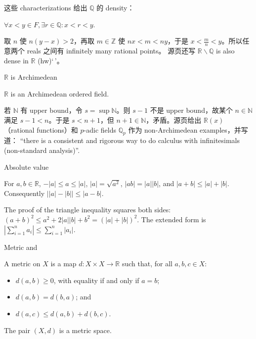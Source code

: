 这些 characterizations 给出 \(\mathbb{Q}\) 的 density：

\(\forall x < y \in F,\exists r \in \mathbb{Q}:x < r < y.\)

取 \(n\) 使 \(n\left( {y - x} \right) > 2\)，再取 \(m \in \mathbb{Z}\) 使 \(nx < m < ny\)，于是 \(x < \frac{m}{n} < y\)。所以任意两个 reals 之间有 infinitely many rational points。 源页还写 \(\mathbb{R} \smallsetminus \mathbb{Q}\) is also dense in \(\mathbb{R}\) (hw)`\,'。

\begin{theorem}{\(\mathbb{R}\) is Archimedean}

\(\mathbb{R}\) is an Archimedean ordered field.

\end{theorem}

若 \(\mathbb{N}\) 有 upper bound，令 \(s = \sup\mathbb{N}\)。则 \(s - 1\) 不是 upper bound，故某个 \(n \in \mathbb{N}\) 满足 \(s - 1 < n\)。于是 \(s < n + 1\)，但 \(n + 1 \in \mathbb{N}\)，矛盾。源页给出 \(\mathbb{R}(x)\)（rational functions）和 \(p\)-adic fields \(\mathbb{Q}_{p}\) 作为 non-Archimedean examples，并写道： ``there is a consistent and rigorous way to do calculus with infinitesimals (non-standard analysis)''.

\begin{definition}{Absolute value}

For \(a,b \in \mathbb{R}\), \(- |a| \leq a \leq |a|\), \(|a| = \sqrt{a^{2}}\), \(\left| {ab} \right| = |a||b|\), and \(\left| {a + b} \right| \leq |a| + |b|\). Consequently \(\left| {|a| - |b|} \right| \leq \left| {a - b} \right|\).

\end{definition}

The proof of the triangle inequality squares both sides: \(\left( {a + b} \right)^{2} \leq a^{2} + 2|a||b| + b^{2} = \left( {|a| + |b|} \right)^{2}\). The extended form is \(\left| {\sum_{i = 1}^{n}a_{i}} \right| \leq \sum_{i = 1}^{n}\left| a_{i} \right|\).

\begin{definition}{Metric and }

A metric on \(X\) is a map \(d:X \times X\rightarrow\mathbb{R}\) such that, for all \(a,b,c \in X\):

\begin{itemize}
\tightlist
\item
  \(d\left( {a,b} \right) \geq 0\), with equality if and only if \(a = b\);
\item
  \(d\left( {a,b} \right) = d\left( {b,a} \right)\); and
\item
  \(d\left( {a,c} \right) \leq d\left( {a,b} \right) + d\left( {b,c} \right)\).
\end{itemize}

The pair \(\left( {X,d} \right)\) is a metric space.

\end{definition}

